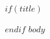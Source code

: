 \documentclass[11pt,a4paper]{article}
\date{}
\begin{document}
$if(title)$\maketitle$endif$
$body$
\end{document}
